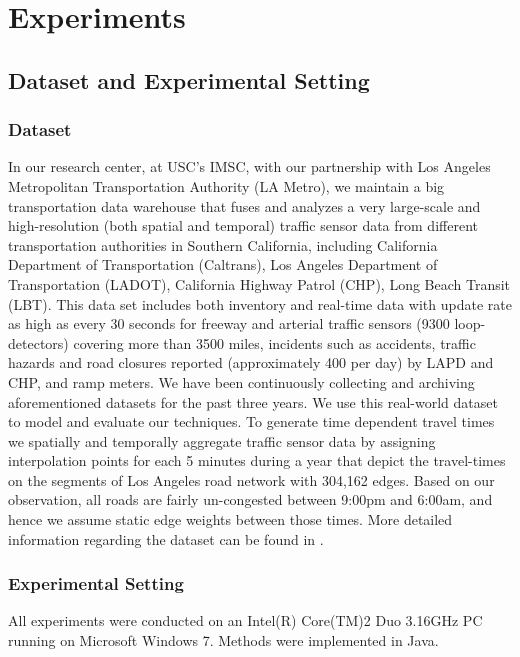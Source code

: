 \section{Experiments}
\label{sec:experiments}
\subsection{Dataset and Experimental Setting}
\subsubsection{Dataset}
\label{subsec:Dataset}
In our research center, at USC's IMSC, with our partnership with Los Angeles Metropolitan Transportation Authority (LA Metro), we maintain a big transportation data warehouse that fuses and analyzes a very large-scale and high-resolution (both spatial and temporal) traffic sensor data from different transportation authorities in Southern California, including California Department of Transportation (Caltrans), Los Angeles Department of Transportation (LADOT), California Highway Patrol (CHP), Long Beach Transit (LBT).  This data set includes both inventory and real-time data with update rate as high as every 30 seconds for freeway and arterial traffic sensors (9300 loop-detectors) covering more than 3500 miles, incidents  such as accidents, traffic hazards and road closures reported (approximately 400 per day) by LAPD and CHP, and ramp meters. We have been continuously collecting and archiving aforementioned datasets for the past three years. We use this real-world dataset to model and evaluate our techniques. To generate time dependent  travel times we spatially and temporally aggregate traffic sensor data by assigning interpolation points for each 5 minutes during a year that depict the travel-times on the segments of Los Angeles road network with 304,162 edges. Based on our observation, all roads are fairly un-congested between 9:00pm and 6:00am, and hence we assume static edge weights between those times. More detailed information regarding the dataset can be found in \cite{Jagadish14}.

\subsubsection{Experimental Setting}
All experiments were conducted on an Intel(R) Core(TM)2 Duo 3.16GHz PC running on Microsoft Windows 7. Methods were implemented in Java.


